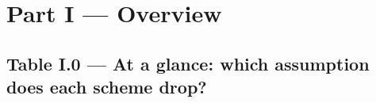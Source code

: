 \landscapeopen
\section*{Part I --- Overview}

\subsection*{Table I.0 --- At a glance: which assumption does each scheme drop?}
